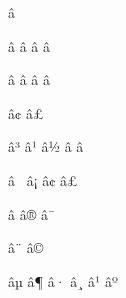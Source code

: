 \mubyte \varemptyset ^^e2^^8c^^80\endmubyte %

\mubyte \lceil ^^e2^^8c^^88\endmubyte %
\mubyte \rceil ^^e2^^8c^^89\endmubyte %
\mubyte \lfloor ^^e2^^8c^^8a\endmubyte %
\mubyte \rfloor ^^e2^^8c^^8b\endmubyte %

\mubyte \ulcorner ^^e2^^8c^^9c\endmubyte %
\mubyte \urcorner ^^e2^^8c^^9d\endmubyte %
\mubyte \llcorner ^^e2^^8c^^9e\endmubyte %
\mubyte \lrcorner ^^e2^^8c^^9f\endmubyte %

\mubyte \frown ^^e2^^8c^^a2\endmubyte %
\mubyte \smile ^^e2^^8c^^a3\endmubyte %

\mubyte \bigtriangleup ^^e2^^96^^b3\endmubyte %
\mubyte \triangleright ^^e2^^96^^b9\endmubyte %
\mubyte \bigtriangledown ^^e2^^96^^bd\endmubyte %
\mubyte \triangleleft ^^e2^^97^^83\endmubyte %
\mubyte \lozenge ^^e2^^97^^8a\endmubyte %

\mubyte \spadesuit ^^e2^^99^^a0\endmubyte %
\mubyte \heartsuit ^^e2^^99^^a1\endmubyte %
\mubyte \diamondsuit ^^e2^^99^^a2\endmubyte %
\mubyte \clubsuit ^^e2^^99^^a3\endmubyte %

\mubyte \flat ^^e2^^99^^ad\endmubyte %
\mubyte \natural ^^e2^^99^^ae\endmubyte %
\mubyte \sharp ^^e2^^99^^af\endmubyte %

\mubyte \langle ^^e2^^9f^^a8\endmubyte %
\mubyte \rangle ^^e2^^9f^^a9\endmubyte %

\mubyte \longleftarrow ^^e2^^9f^^b5\endmubyte %
\mubyte \longrightarrow ^^e2^^9f^^b6\endmubyte %
\mubyte \longleftrightarrow ^^e2^^9f^^b7\endmubyte %
\mubyte \Longleftarrow ^^e2^^9f^^b8\endmubyte %
\mubyte \Longrightarrow ^^e2^^9f^^b9\endmubyte %
\mubyte \Longleftrightarrow ^^e2^^9f^^ba\endmubyte %

